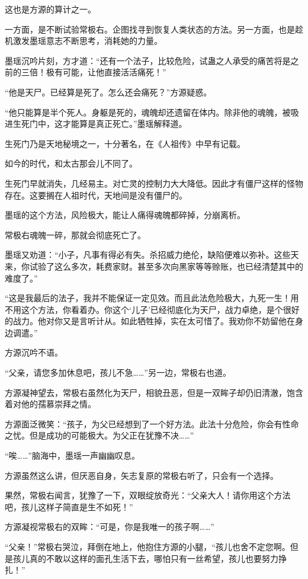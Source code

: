 \begin{this_body}
这也是方源的算计之一。

一方面，是不断试验常极右。企图找寻到恢复人类状态的方法。另一方面，也是趁机激发墨瑶意志不断思考，消耗她的力量。

墨瑶沉吟片刻，方才道：“还有一个法子，比较危险，试蛊之人承受的痛苦将是之前的三倍！极有可能，让他直接活活痛死！”

“他是天尸。已经算是死了。怎么还会痛死？”方源疑惑。

“他只能算是半个死人。身躯是死的，魂魄却还遗留在体内。除非他的魂魄，被吸进生死门中，这才能算是真正死亡。”墨瑶解释道。

生死门乃是天地秘境之一，十分著名，在《人祖传》中早有记载。

如今的时代，和太古那会儿不同了。

生死门早就消失，几经易主。对亡灵的控制力大大降低。因此才有僵尸这样的怪物存在。这要搁在人祖时代，天地间是没有僵尸的。

墨瑶的这个方法，风险极大，能让人痛得魂魄都碎掉，分崩离析。

常极右魂魄一碎，那就会彻底死亡了。

墨瑶又劝道：“小子，凡事有得必有失。杀招威力绝伦，缺陷便难以弥补。这些天来，你试验了这么多次，耗费家财。甚至多次向黑家等等赊账，也已经清楚其中的难度了。”

“这是我最后的法子，我并不能保证一定见效。而且此法危险极大，九死一生！用不用这个方法，你看着办。你这个‘儿子’已经彻底化为天尸，战力卓绝，是个很好的战力。他对你又是言听计从。如此牺牲掉，实在太可惜了。我劝你不妨留他在身边调遣。”

方源沉吟不语。

“父亲，请您多加休息吧，孩儿不急……”另一边，常极右也道。

方源凝神望去，常极右虽然化为天尸，相貌丑恶，但是一双眸子却仍旧清澈，饱含着对他的孺慕崇拜之情。

方源面泛微笑：“孩子，为父已经想到了一个好方法。此法十分危险，你会有性命之忧。但是成功的可能极大。为父正在犹豫不决……”

“唉……”脑海中，墨瑶一声幽幽叹息。

方源虽然这么讲，但厌恶自身，矢志复原的常极右听了，只会有一个选择。

果然，常极右闻言，犹豫了一下，双眼绽放奇光：“父亲大人！请你用这个方法吧，孩儿这样子简直是生不如死！”

方源凝视常极右的双眸：“可是，你是我唯一的孩子啊……”

“父亲！”常极右哭泣，拜倒在地上，他抱住方源的小腿，“孩儿也舍不定您啊。但是孩儿真的不敢以这样的面孔生活下去，哪怕只有一丝希望，孩儿也要努力挣扎！”


\end{this_body}
